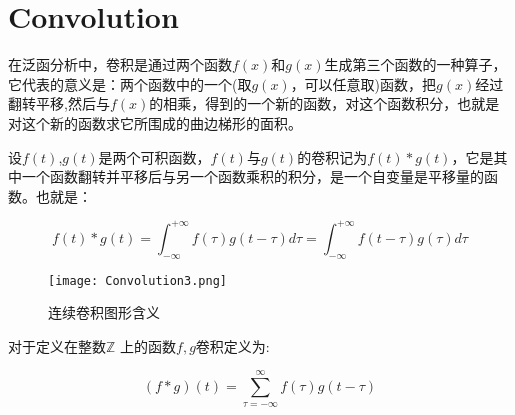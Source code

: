 \section{Convolution}

在泛函分析中，卷积是通过两个函数$f(x)$和$g(x)$生成第三个函数的一种算子，它代表的意义是：两个函数中的一个(取$g(x)$，可以任意取)函数，把$g(x)$经过翻转平移,然后与$f(x)$的相乘，得到的一个新的函数，对这个函数积分，也就是对这个新的函数求它所围成的曲边梯形的面积。

设$f(t)$,$g(t)$是两个可积函数，$f(t)$与$g(t)$的卷积记为$f(t) * g(t)$，它是其中一个函数翻转并平移后与另一个函数乘积的积分，是一个自变量是平移量的函数。也就是：

\begin{equation}
    f(t) * g(t)=\int_{-\infty}^{+\infty} f(\tau) g(t-\tau) d \tau=\int_{-\infty}^{+\infty} f(t-\tau) g(\tau) d \tau
\end{equation}

\begin{figure}[htb!]
    \centering
    \texttt{[image: Convolution3.png]}
    \caption{连续卷积图形含义}
\end{figure}

对于定义在整数$\mathbb{Z}$ 上的函数$f,g$卷积定义为:

\begin{equation}
    (f * g)(t)=\sum_{\tau=-\infty}^{\infty} f(\tau) g(t-\tau)
\end{equation}